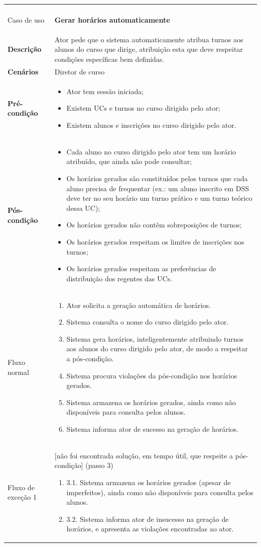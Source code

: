 \documentclass[12pt, a4paper]{article}
\newenvironment{condition}{
    \begin{itemize}[wide=0pt]
        \vspace{-0.2cm}
}{
        \vspace{-0.5cm}
    \end{itemize}
}
\newcommand\flow[1]{
    Fluxo normal &
    \vspace{-0.9cm}
    \singlespacing
    \begin{enumerate}[wide=0pt]
        #1
        \vspace{-0.3cm}
    \end{enumerate} \\ \hline
}
\newcommand\otherflow[3]{
    #1 &
    #2
    \singlespacing
    \begin{enumerate}[wide=0pt]
        #3
        \vspace{-0.3cm}
    \end{enumerate} \\ \hline
}
\newenvironment{usecase}[5]{
    \begin{longtable}{|>{\centering\arraybackslash\bf}m{3cm}|m{13cm}|}
        \multicolumn{2}{c}{\ldots Continua \ldots} \\
        \endfoot
        \endlastfoot

        \hline
        Caso de uso & \textbf{#1} \\

        \hline
        Descrição & #2 \\

        \hline
        Cenários & #3 \\

        \hline
        Pré-condição &
        \vspace{-0.8cm}
        \begin{condition}
            #4
        \end{condition} \\

        \hline
        Pós-condição &
        \vspace{-0.8cm}
        \begin{condition}
            #5
        \end{condition} \\

        \hline
}{
\end{longtable}
}
\begin{document}
\begin{usecase}
    {Gerar horários automaticamente}
    {
        Ator pede que o sistema automaticamente atribua turnos aos alunos do curso que dirige,
        atribuição esta que deve respeitar condições específicas bem definidas.
    }
    {Diretor de curso}
    {
        \item Ator tem sessão iniciada;
        \item Existem UCs e turnos no curso dirigido pelo ator;
        \item Existem alunos e inscrições no curso dirigido pelo ator.
    }
    {
        \item Cada aluno no curso dirigido pelo ator tem um horário atribuído, que ainda não pode
            consultar;
        \item Os horários gerados são constituídos pelos turnos que cada aluno precisa de frequentar
            (ex.: um aluno inscrito em DSS deve ter no seu horário um turno prático e um turno
             teórico dessa UC);
        \item Os horários gerados não contêm sobreposições de turnos;
        \item Os horários gerados respeitam os limites de inscrições nos turnos;
        \item Os horários gerados respeitam as preferências de distribuição dos regentes das UCs.
    }

    \flow{
        \item Ator solicita a geração automática de horários.
        \item Sistema consulta o nome do curso dirigido pelo ator.
        \item Sistema gera horários, inteligentemente atribuindo turnos aos alunos do curso
            dirigido pelo ator, de modo a respeitar a pós-condição.
        \item Sistema procura violações da pós-condição nos horários gerados.
        \item Sistema armazena os horários gerados, ainda como não disponíveis para consulta pelos
            alunos.
        \item Sistema informa ator de sucesso na geração de horários.
    }

    \otherflow{Fluxo de exceção 1}
        {[não foi encontrada solução, em tempo útil, que respeite a pós-condição] (passo 3)}{

        \item[3.1.] Sistema armazena os horários gerados (apesar de imperfeitos), ainda como não
            disponíveis para consulta pelos alunos.
        \item[3.2.] Sistema informa ator de insucesso na geração de horários, e apresenta as
            violações encontradas ao ator.
    }
\end{usecase}
\end{document}
